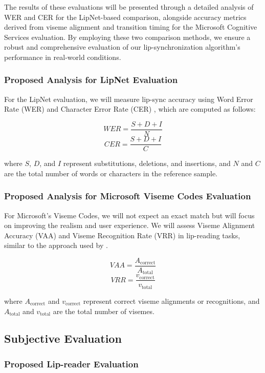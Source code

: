 \documentclass[12pt]{article}
\begin{document}
The results of these evaluations will be presented through a detailed analysis of WER and CER for the LipNet-based comparison, alongside accuracy metrics derived from viseme alignment and transition timing for the Microsoft Cognitive Services evaluation. By employing these two comparison methods, we ensure a robust and comprehensive evaluation of our lip-synchronization algorithm’s performance in real-world conditions.

\subsubsection{Proposed Analysis for LipNet Evaluation}

For the LipNet evaluation, we will measure lip-sync accuracy using Word Error Rate (WER) and Character Error Rate (CER) \cite{KlakowTestingQ}, which are computed as follows:

\[
WER = \frac{S + D + I}{N}
\]
\[
CER = \frac{S + D + I}{C}
\]

where $S$, $D$, and $I$ represent substitutions, deletions, and insertions, and $N$ and $C$ are the total number of words or characters in the reference sample.

\subsubsection{Proposed Analysis for Microsoft Viseme Codes Evaluation}

For Microsoft’s Viseme Codes, we will not expect an exact match but will focus on improving the realism and user experience. We will assess Viseme Alignment Accuracy (VAA) and Viseme Recognition Rate (VRR) in lip-reading tasks, similar to the approach used by \cite{Santos2023ALipreading}.

\[
VAA = \frac{A_{\text{correct}}}{A_{\text{total}}}
\]
\[
VRR = \frac{v_{\text{correct}}}{v_{\text{total}}}
\]

where $A_{\text{correct}}$ and $v_{\text{correct}}$ represent correct viseme alignments or recognitions, and $A_{\text{total}}$ and $v_{\text{total}}$ are the total number of visemes.

\subsection{Subjective Evaluation}
\subsubsection{Proposed Lip-reader Evaluation}
\end{document}

